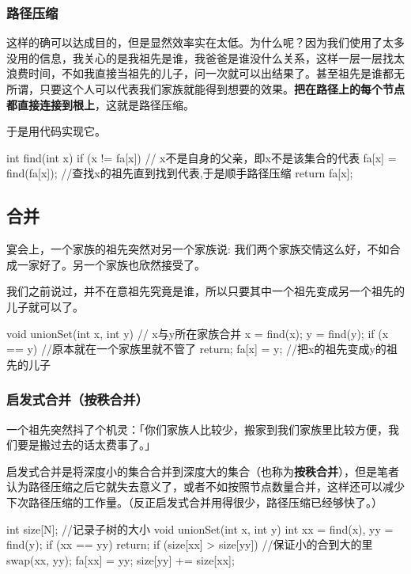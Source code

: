 \subsubsection{路径压缩}

这样的确可以达成目的，但是显然效率实在太低。为什么呢？因为我们使用了太多没用的信息，我关心的是我祖先是谁，我爸爸是谁没什么关系，这样一层一层找太浪费时间，不如我直接当祖先的儿子，问一次就可以出结果了。甚至祖先是谁都无所谓，只要这个人可以代表我们家族就能得到想要的效果。\textbf{把在路径上的每个节点都直接连接到根上}，这就是路径压缩。 

于是用代码实现它。

\begin{cppcode}
int find(int x) {
  if (x != fa[x])  // x不是自身的父亲，即x不是该集合的代表
    fa[x] = find(fa[x]);  //查找x的祖先直到找到代表,于是顺手路径压缩
  return fa[x];
}
\end{cppcode}

\subsection{合并}

宴会上，一个家族的祖先突然对另一个家族说: 我们两个家族交情这么好，不如合成一家好了。另一个家族也欣然接受了。  

我们之前说过，并不在意祖先究竟是谁，所以只要其中一个祖先变成另一个祖先的儿子就可以了。

\begin{cppcode}
void unionSet(int x, int y)  // x与y所在家族合并
{
  x = find(x);
  y = find(y);
  if (x == y)  //原本就在一个家族里就不管了
    return;
  fa[x] = y;  //把x的祖先变成y的祖先的儿子
}
\end{cppcode}

\subsubsection{启发式合并（按秩合并）}

一个祖先突然抖了个机灵：「你们家族人比较少，搬家到我们家族里比较方便，我们要是搬过去的话太费事了。」  

启发式合并是将深度小的集合合并到深度大的集合（也称为\textbf{按秩合并}），但是笔者认为路径压缩之后它就失去意义了，或者不如按照节点数量合并，这样还可以减少下次路径压缩的工作量。（反正启发式合并用得很少，路径压缩已经够快了。）

\begin{cppcode}
int size[N];  //记录子树的大小
void unionSet(int x, int y) {
  int xx = find(x), yy = find(y);
  if (xx == yy) return;
  if (size[xx] > size[yy])  //保证小的合到大的里
    swap(xx, yy);
  fa[xx] = yy;
  size[yy] += size[xx];
}
\end{cppcode}

